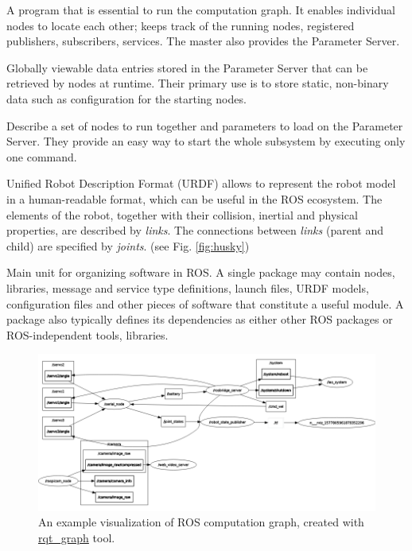 \documentclass[english,inz,shortabstract]{iithesis}
\begin{document}
\begin{description}[style=nextline]
        \item [Master]
        A program that is essential to run the computation graph. It enables individual nodes to locate each other; keeps track of the running nodes, registered publishers, subscribers, services. The master also provides the Parameter Server.  
        \item [Parameters]
        Globally viewable data entries stored in the Parameter Server that can be retrieved by nodes at runtime. Their primary use is to store static, non-binary data such as configuration for the starting nodes.
        \item [Launch files]
        Describe a set of nodes to run together and parameters to load on the Parameter Server. They provide an easy way to start the whole subsystem by executing only one command. 
        \item [URDF model]
        Unified Robot Description Format (URDF) allows to represent the robot model in a human-readable format, which can be useful in the ROS ecosystem. The elements of the robot, together with their collision, inertial and physical properties, are described by \textit{links}. The connections between \textit{links} (parent and child) are specified by \textit{joints}. (see Fig. \ref{fig:husky}) 
        \item [Packages]
        Main unit for organizing software in ROS. A single package may contain nodes, libraries, message and service type definitions, launch files, URDF models, configuration files and other pieces of software that constitute a useful module. A package also typically defines its dependencies as either other ROS packages or ROS-independent tools, libraries.

    \end{description}

    \begin{figure}[ht]
        \centering
        \captionsetup{margin=2cm}
        \includegraphics[width=\textwidth]{img/rqt_graph.png}
        \caption{An example visualization of ROS computation graph, created with  \href{http://wiki.ros.org/rqt_graph}{rqt\_graph} tool.}
        \label{fig:ros_graph}
    \end{figure}
\end{document}
